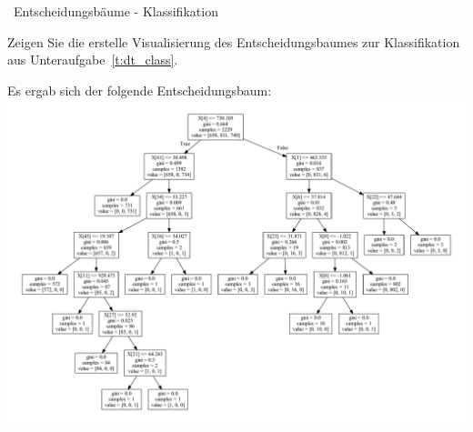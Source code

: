 \begin{task}[credit=4]{\codesym~Entscheidungsbäume - Klassifikation}
 \begin{subtask}[points=1,title=Visualisierung]
Zeigen Sie die erstelle Visualisierung des Entscheidungsbaumes zur Klassifikation aus Unteraufgabe~\ref{t:dt_class}.

\begin{solution}
	Es ergab sich der folgende Entscheidungsbaum:
\includegraphics[width=\linewidth]{classification_tree.pdf}
\end{solution}

\end{subtask}
\end{task}

